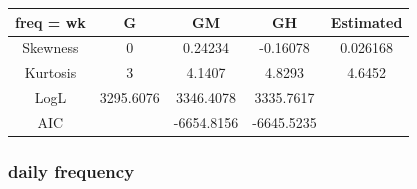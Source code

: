 \documentclass[16pt]{extarticle}
\begin{document}
\begin{center}
	\begin{tabular}{|c || c| c| c| c|} 
		\hline
		 freq = wk & G & GM & GH & Estimated\\ [0.5ex] 
		\hline\hline
		Skewness & 0 & 0.24234 & -0.16078 & 0.026168\\ 
		\hline
		Kurtosis & 3 & 4.1407 & 4.8293 & 4.6452\\
		\hline
		LogL & 3295.6076 & 3346.4078 & 3335.7617 \\
		\hline
		AIC &  & -6654.8156 & -6645.5235 \\[1ex] 
		\hline
	\end{tabular}
\end{center}


\subsubsection{daily frequency}
\end{document}
